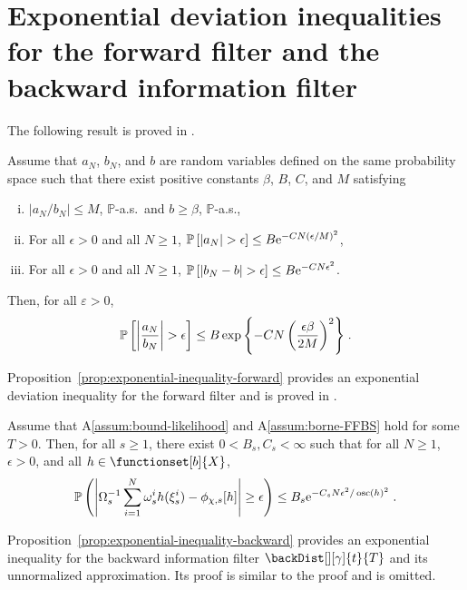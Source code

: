 \section{Exponential deviation inequalities for the forward filter and the backward information filter}
\label{sec:appendix:expdev}The following result is proved in \cite{douc:garivier:moulines:olsson:2011}.
\begin{lem}
\label{lem:hoeffding:ratio}
Assume that $a_N$, $b_N$, and $b$ are random variables defined on the same probability space such that there exist positive constants $\beta$, $B$, $C$, and $M$ satisfying
\begin{enumerate}[(i)]
    \item \label{it:bound:ab} $|a_N/b_N|\leq M$, $\mathbb{P}$-a.s.\ and  $b \geq \beta$, $\mathbb{P}$-a.s.,
    \item \label{it:hoeff:a} For all $\epsilon>0$ and all $N\geq1$, $\mathbb{P} \left[ |a_N|>\epsilon \right]\leq B \rme^{-C N \left(\epsilon/M\right)^2}$,
    \item \label{it:hoeff:b} For all $\epsilon>0$ and all $N\geq1$, $\mathbb{P}\left[|b_N-b|>\epsilon \right]\leq B \rme^{-C N \epsilon^2}$.
\end{enumerate}
Then, for all $\varepsilon>0$,
\[
\mathbb{P}\left[ \left| \frac{a_N}{b_N} \right| > \epsilon \right] \leq B \exp{\left\{-C N \left(\frac{\epsilon \beta}{2M} \right)^2 \right\}} \;.
\]
\end{lem}

Proposition~\ref{prop:exponential-inequality-forward} provides an exponential deviation inequality for the forward filter and is proved in \cite{douc:garivier:moulines:olsson:2011}.
\begin{prop}
\label{prop:exponential-inequality-forward}
Assume that A\ref{assum:bound-likelihood} and A\ref{assum:borne-FFBS} hold for some $T > 0$. Then, for all $s\geq 1$,
there exist $0 <B_s, C_s <\infty$ such that for all $N\ge 1$, $\epsilon > 0$, and all $h \in \functionset[b]{X}$,
\begin{equation*}
\PP\left( \left| \sumwght{s}^{-1 } \sum_{i=1}^N \swght{s}{i} h(\epartpred{s}{i}) - \filt{\Xinit,s}[h] \right| \geq \epsilon \right) \leq B_s \rme^{-C_s N \epsilon^2 / \oscnorm{h}^2}\eqsp.
\end{equation*}
\end{prop}

Proposition~\ref{prop:exponential-inequality-backward} provides an exponential inequality for the backward information filter $\backDist[][\gamma]{t}{T}$ and its unnormalized approximation. Its proof is similar to the proof \cite[Theorem~5]{douc:garivier:moulines:olsson:2011} and is omitted.

